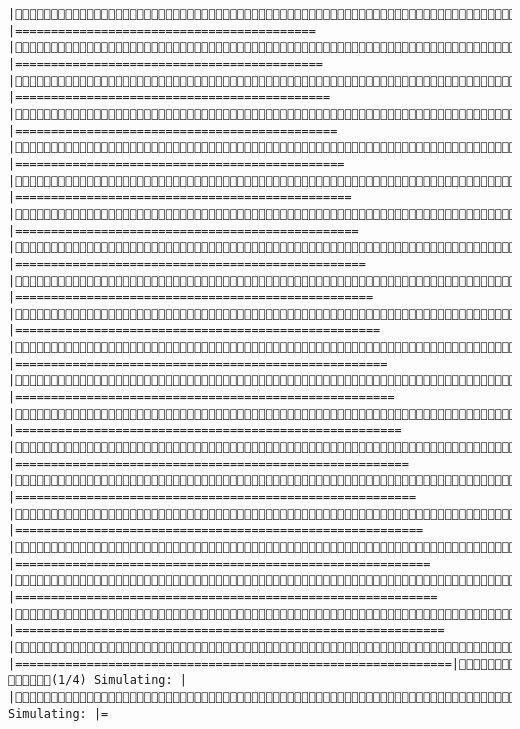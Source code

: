\documentclass[]{article}
\begin{document}
\begin{verbatim}
|Simulating: |==========================================                   |Simulating: |===========================================                  |Simulating: |============================================                 |Simulating: |=============================================                |Simulating: |==============================================               |Simulating: |===============================================              |Simulating: |================================================             |Simulating: |=================================================            |Simulating: |==================================================           |Simulating: |===================================================          |Simulating: |====================================================         |Simulating: |=====================================================        |Simulating: |======================================================       |Simulating: |=======================================================      |Simulating: |========================================================     |Simulating: |=========================================================    |Simulating: |==========================================================   |Simulating: |===========================================================  |Simulating: |============================================================ |Simulating: |=============================================================|(1/4) (1/4) Simulating: |                                                       |(1/4) Simulating: |=                                                      
\end{verbatim}
\end{document}
